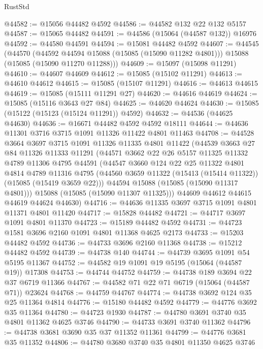 \begin{lexlean}{RustStd}
\begin{coremodule}
@44582 := @15056 @44482 @4592
@44586 := @44582 @132 @22 @132 @5157
@44587 := @15065 @44482
@44591 := @44586 (@15064 (@44587 @132)) @16976
@44592 := @44580 @44591
@44594 := @15081 @44482 @4592
@44607 := @44545
    (@44570
      (@44592 @44594 @15088 (@15085 (@15090 @11282 @4801)))
      @15088
      (@15085 (@15090 @11270 @11288)))
@44609 := @15097 (@15098 @11291)
@44610 := @44607 @44609
@44612 := @15085 (@15102 @11291)
@44613 := @44610 @44612
@44615 := @15085 (@15107 @11291)
@44616 := @44613 @44615
@44619 := @15085 (@15111 @11291 @27)
@44620 := @44616 @44619
@44624 := @15085 (@15116 @3643 @27 @84)
@44625 := @44620 @44624
@44630 := @15085 (@15122 (@15123 (@15124 @11291)) @4592)
@44632 := @44536 (@44625 @44630)
@44636 := @16671 @44482 @4592 @4592 @18111
@44644 := @44636 @11301 @3716 @3715 @1091 @11326 @11422 @4801 @11463
@44708 := @44528
    @3664
    @3697
    @3715
    @1091
    @11326
    @11335
    @4801
    @11422
    (@44539
      @3663
      @27
      @84
      @11326
      @11333
      @11291
      (@44571
        @3662
        @22
        @26
        @5157
        @11325
        @11332
        @4789
        @11306
        @4795
        @44591
        (@44547
          @3660
          @124
          @22
          @25
          @11322
          @4801
          @4814
          @4789
          @11316
          @4795
          (@44560 @3659 @11322 (@15413 (@15414 @11322)) (@15085 (@15419 @3659 @22)))
          @44594
          @15088
          (@15085 (@15090 @11317 @4801)))
        @15088
        (@15085 (@15090 @11307 @11325)))
      @44609
      @44612
      @44615
      @44619
      @44624
      @44630)
@44716 := @44636 @11335 @3697 @3715 @1091 @4801 @11371 @4801 @11420
@44717 := @15828 @44482
@44721 := @44717 @3697 @1091 @4801 @11370
@44723 := @15189 @44482 @4592
@44731 := @44723 @1581 @3696 @2160 @1091 @4801 @11368 @4625 @2173
@44733 := @15203 @44482 @4592
@44736 := @44733 @3696 @2160 @11368
@44738 := @15212 @44482 @4592
@44739 := @44738 @140
@44744 := @44739 @3695 @1091 @54 @5195 @11367
@44752 := @44582 @19 @1091 @19 @5195 (@15064 (@44587 @19)) @17308
@44753 := @44744 @44752
@44759 := @44738 @189 @3694 @22 @37 @6719 @11366
@44767 := @44582 @71 @22 @71 @6719 (@15064 (@44587 @71)) @23624
@44768 := @44759 @44767
@44774 := @44738 @3692 @124 @35 @25 @11364 @4814
@44776 := @15180 @44482 @4592
@44779 := @44776 @3692 @35 @11364
@44780 := @44723 @1930
@44787 := @44780 @3691 @3740 @35 @4801 @11362 @4625 @3746
@44790 := @44733 @3691 @3740 @11362
@44796 := @44738 @3681 @3690 @35 @37 @11352 @11361
@44799 := @44776 @3681 @35 @11352
@44806 := @44780 @3680 @3740 @35 @4801 @11350 @4625 @3746

\end{coremodule}
\end{lexlean}
